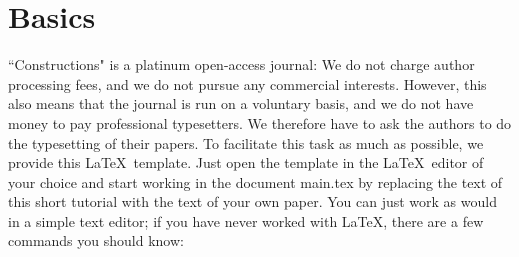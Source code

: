 \documentclass[]{constructions}
\begin{document}
\vspace{10pt}
\section{Basics}\label{Sec:Introduction}
``Constructions" is a platinum open-access journal: We do not charge author processing fees, and we do not pursue any commercial interests. However, this also means that the journal is run on a voluntary basis, and we do not have money to pay professional typesetters. We therefore have to ask the authors to do the typesetting of their papers. To facilitate this task as much as possible, we provide this \LaTeX \ template. Just open the template in the \LaTeX \  editor of your choice and start working in the document main.tex by replacing the text of this short tutorial with the text of your own paper. You can just work as would in a simple text editor; if you have never worked with \LaTeX, there are a few commands you should know:
\end{document}
